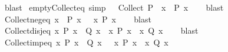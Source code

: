\begin{isabellebody}
\endisadelimproof
%
\isatagproof
{}\isamarkupfalse%
\ blast%
\endisatagproof
{\isafoldproof}%
%
\isadelimproof
\isanewline
%
\endisadelimproof
\isanewline
{}\isamarkupfalse%
\ empty{\isacharunderscore}{\kern0pt}Collect{\isacharunderscore}{\kern0pt}eq\ {\isacharbrackleft}{\kern0pt}simp{\isacharbrackright}{\kern0pt}{\isacharcolon}{\kern0pt}\ {\isachardoublequoteopen}{\isacharbraceleft}{\kern0pt}{\isacharbraceright}{\kern0pt}\ {\isacharequal}{\kern0pt}\ Collect\ P\ {\isasymlongleftrightarrow}\ {\isacharparenleft}{\kern0pt}{\isasymforall}x{\isachardot}{\kern0pt}\ {\isasymnot}\ P\ x{\isacharparenright}{\kern0pt}{\isachardoublequoteclose}\isanewline
%
\isadelimproof
\ \ %
\endisadelimproof
%
\isatagproof
{}\isamarkupfalse%
\ blast%
\endisatagproof
{\isafoldproof}%
%
\isadelimproof
\isanewline
%
\endisadelimproof
\isanewline
{}\isamarkupfalse%
\ Collect{\isacharunderscore}{\kern0pt}neg{\isacharunderscore}{\kern0pt}eq{\isacharcolon}{\kern0pt}\ {\isachardoublequoteopen}{\isacharbraceleft}{\kern0pt}x{\isachardot}{\kern0pt}\ {\isasymnot}\ P\ x{\isacharbraceright}{\kern0pt}\ {\isacharequal}{\kern0pt}\ {\isacharminus}{\kern0pt}\ {\isacharbraceleft}{\kern0pt}x{\isachardot}{\kern0pt}\ P\ x{\isacharbraceright}{\kern0pt}{\isachardoublequoteclose}\isanewline
%
\isadelimproof
\ \ %
\endisadelimproof
%
\isatagproof
{}\isamarkupfalse%
\ blast%
\endisatagproof
{\isafoldproof}%
%
\isadelimproof
\isanewline
%
\endisadelimproof
\isanewline
{}\isamarkupfalse%
\ Collect{\isacharunderscore}{\kern0pt}disj{\isacharunderscore}{\kern0pt}eq{\isacharcolon}{\kern0pt}\ {\isachardoublequoteopen}{\isacharbraceleft}{\kern0pt}x{\isachardot}{\kern0pt}\ P\ x\ {\isasymor}\ Q\ x{\isacharbraceright}{\kern0pt}\ {\isacharequal}{\kern0pt}\ {\isacharbraceleft}{\kern0pt}x{\isachardot}{\kern0pt}\ P\ x{\isacharbraceright}{\kern0pt}\ {\isasymunion}\ {\isacharbraceleft}{\kern0pt}x{\isachardot}{\kern0pt}\ Q\ x{\isacharbraceright}{\kern0pt}{\isachardoublequoteclose}\isanewline
%
\isadelimproof
\ \ %
\endisadelimproof
%
\isatagproof
{}\isamarkupfalse%
\ blast%
\endisatagproof
{\isafoldproof}%
%
\isadelimproof
\isanewline
%
\endisadelimproof
\isanewline
{}\isamarkupfalse%
\ Collect{\isacharunderscore}{\kern0pt}imp{\isacharunderscore}{\kern0pt}eq{\isacharcolon}{\kern0pt}\ {\isachardoublequoteopen}{\isacharbraceleft}{\kern0pt}x{\isachardot}{\kern0pt}\ P\ x\ {\isasymlongrightarrow}\ Q\ x{\isacharbraceright}{\kern0pt}\ {\isacharequal}{\kern0pt}\ {\isacharminus}{\kern0pt}\ {\isacharbraceleft}{\kern0pt}x{\isachardot}{\kern0pt}\ P\ x{\isacharbraceright}{\kern0pt}\ {\isasymunion}\ {\isacharbraceleft}{\kern0pt}x{\isachardot}{\kern0pt}\ Q\ x{\isacharbraceright}{\kern0pt}{\isachardoublequoteclose}\isanewline

\end{isabellebody}
